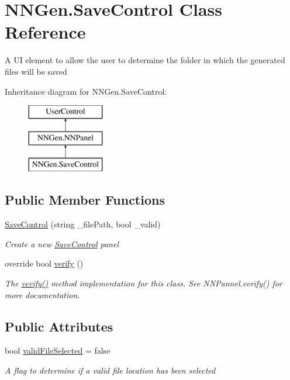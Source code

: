 \hypertarget{class_n_n_gen_1_1_save_control}{}\section{N\+N\+Gen.\+Save\+Control Class Reference}
\label{class_n_n_gen_1_1_save_control}


A U\+I element to allow the user to determine the folder in which the generated files will be saved  


Inheritance diagram for N\+N\+Gen.\+Save\+Control\+:\begin{figure}[H]
\begin{center}
\leavevmode
\includegraphics[height=3.000000cm]{class_n_n_gen_1_1_save_control}
\end{center}
\end{figure}
\subsection*{Public Member Functions}
\begin{DoxyCompactItemize}
\item 
\hyperlink{class_n_n_gen_1_1_save_control_affccf4dd0d6bb71a158c12f5be37d8dd}{Save\+Control} (string \+\_\+file\+Path, bool \+\_\+valid)
\begin{DoxyCompactList}\small\item\em Create a new \hyperlink{class_n_n_gen_1_1_save_control}{Save\+Control} panel \end{DoxyCompactList}\item 
override bool \hyperlink{class_n_n_gen_1_1_save_control_a9802bdb470edb0fbc0fe3d7b04863f6c}{verify} ()
\begin{DoxyCompactList}\small\item\em The \hyperlink{class_n_n_gen_1_1_save_control_a9802bdb470edb0fbc0fe3d7b04863f6c}{verify()} method implementation for this class. See N\+N\+Pannel.\+verify() for more documentation. \end{DoxyCompactList}\end{DoxyCompactItemize}
\subsection*{Public Attributes}
\begin{DoxyCompactItemize}
\item 
bool \hyperlink{class_n_n_gen_1_1_save_control_a5fd0da9af116b678a881f5ceb5ec0c40}{valid\+File\+Selected} = false
\begin{DoxyCompactList}\small\item\em A flag to determine if a valid file location has been selected \end{DoxyCompactList}\end{DoxyCompactItemize}
